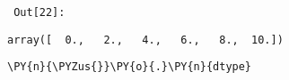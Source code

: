         {\par%
        \vspace{-1\smallerfontscale}%
        \noindent%
        \begin{minipage}{\cellleftmargin}%
    \hfill%
    {\smaller%
    \tt%
    \color{nbframe-out-prompt}%
    Out[22]:}%
    \hspace{\inputpadding}%
    \hspace{0em}%
    \hspace{3pt}%
    \end{minipage}%
        }%
    \begin{addmargin}[\cellleftmargin]{0em}%
    {\smaller%
    \vspace{-1\smallerfontscale}%
    
    
    
    \begin{verbatim}
array([  0.,   2.,   4.,   6.,   8.,  10.])
    \end{verbatim}

    
}%
    \end{addmargin}%

{\par%
\vspace{-1\baselineskip}%
}%
\begin{notebookcell}[23]%
\begin{addmargin}[\cellleftmargin]{0em}%
{\smaller%
\par%
%
\vspace{-1\smallerfontscale}%
\begin{Verbatim}[commandchars=\\\{\}]
\PY{n}{\PYZus{}}\PY{o}{.}\PY{n}{dtype}
\end{Verbatim}
%
\par%
\vspace{-1\smallerfontscale}}%
\end{addmargin}
\end{notebookcell}

\par\vspace{1\smallerfontscale}%
    
